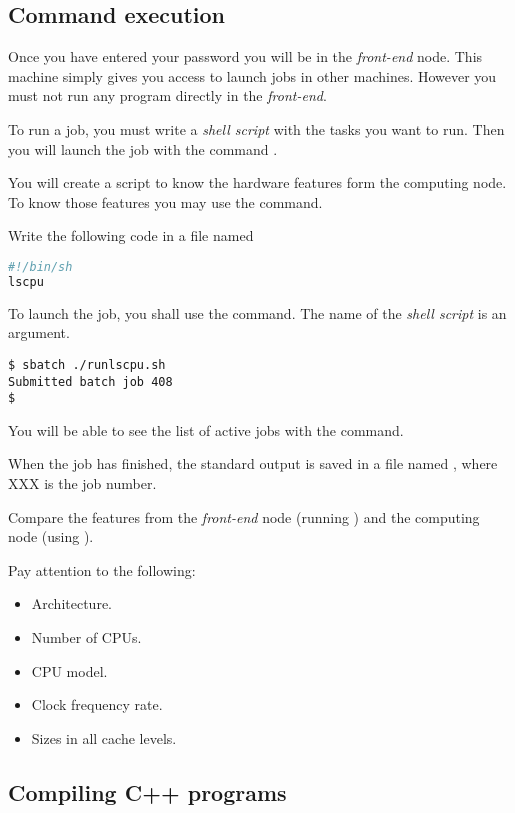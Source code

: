 \subsection{Command execution}

Once you have entered your password you will be in the \emph{front-end} node.
This machine simply gives you access to launch jobs in other machines.
However you must not run any program directly in the \emph{front-end}.

To run a job, you must write a \emph{shell script} with the tasks you want
to run. Then you will launch the job with the command .

You will create a script to know the hardware features form the computing node.
To know those features you may use the  command.

Write the following code in a file named 

\begin{lstlisting}[language=bash,frame=single,title={File: runlscpu.sh}]
#!/bin/sh
lscpu
\end{lstlisting}

To launch the job, you shall use the  command.
The name of the \emph{shell script} is an argument.

\begin{lstlisting}[style=terminal]
$ sbatch ./runlscpu.sh
Submitted batch job 408
$
\end{lstlisting}

You will be able to see the list of active jobs with the  command.

When the job has finished, the standard output is saved in a file named
, where XXX is the job number.

Compare the features from the \emph{front-end} node (running )
and the computing node (using ).

Pay attention to the following:
\begin{itemize}
  \item Architecture.
  \item Number of CPUs.
  \item CPU model.
  \item Clock frequency rate.
  \item Sizes in all cache levels.
\end{itemize}

\subsection{Compiling C++ programs}

